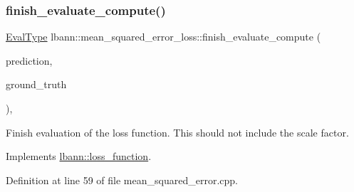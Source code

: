 \subsubsection{\texorpdfstring{finish\+\_\+evaluate\+\_\+compute()}{finish\_evaluate\_compute()}}
{\footnotesize\ttfamily \hyperlink{base_8hpp_a3266f5ac18504bbadea983c109566867}{Eval\+Type} lbann\+::mean\+\_\+squared\+\_\+error\+\_\+loss\+::finish\+\_\+evaluate\+\_\+compute (\begin{DoxyParamCaption}\item[{const \hyperlink{base_8hpp_a9a697a504ae84010e7439ffec862b470}{Abs\+Dist\+Mat} \&}]{prediction,  }\item[{const \hyperlink{base_8hpp_a9a697a504ae84010e7439ffec862b470}{Abs\+Dist\+Mat} \&}]{ground\+\_\+truth }\end{DoxyParamCaption})\hspace{0.3cm}{\ttfamily [override]}, {\ttfamily [virtual]}}

Finish evaluation of the loss function. This should not include the scale factor. 

Implements \hyperlink{classlbann_1_1loss__function_a3ea8553a4e9c75477d7d4fc533c4d4fd}{lbann\+::loss\+\_\+function}.



Definition at line 59 of file mean\+\_\+squared\+\_\+error.\+cpp.


